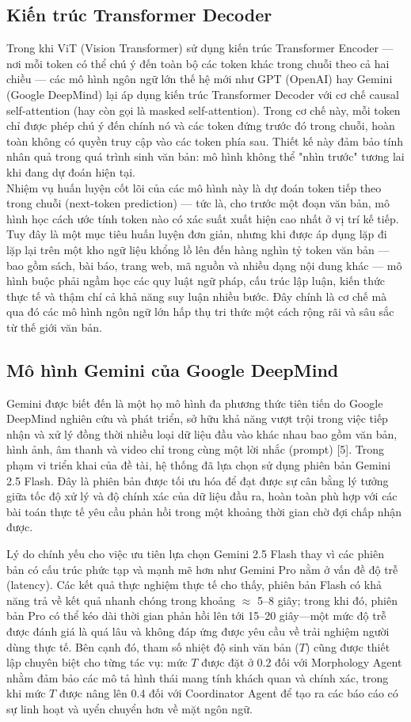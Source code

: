 \subsection{Kiến trúc Transformer Decoder}
Trong khi ViT (Vision Transformer) sử dụng kiến trúc Transformer Encoder — nơi mỗi token có thể chú ý đến toàn bộ các token khác trong chuỗi theo cả hai chiều — các mô hình ngôn ngữ lớn thế hệ mới như GPT (OpenAI) hay Gemini (Google DeepMind) lại áp dụng kiến trúc Transformer Decoder với cơ chế causal self-attention (hay còn gọi là masked self-attention). Trong cơ chế này, mỗi token chỉ được phép chú ý đến chính nó và các token đứng trước đó trong chuỗi, hoàn toàn không có quyền truy cập vào các token phía sau. Thiết kế này đảm bảo tính nhân quả trong quá trình sinh văn bản: mô hình không thể "nhìn trước" tương lai khi đang dự đoán hiện tại.\\
\indent Nhiệm vụ huấn luyện cốt lõi của các mô hình này là dự đoán token tiếp theo trong chuỗi (next-token prediction) — tức là, cho trước một đoạn văn bản, mô hình học cách ước tính token nào có xác suất xuất hiện cao nhất ở vị trí kế tiếp. Tuy đây là một mục tiêu huấn luyện đơn giản, nhưng khi được áp dụng lặp đi lặp lại trên một kho ngữ liệu khổng lồ lên đến hàng nghìn tỷ token văn bản — bao gồm sách, bài báo, trang web, mã nguồn và nhiều dạng nội dung khác — mô hình buộc phải ngầm học các quy luật ngữ pháp, cấu trúc lập luận, kiến thức thực tế và thậm chí cả khả năng suy luận nhiều bước. Đây chính là cơ chế mà qua đó các mô hình ngôn ngữ lớn hấp thụ tri thức một cách rộng rãi và sâu sắc từ thế giới văn bản.

\subsection{Mô hình Gemini của Google DeepMind}
Gemini được biết đến là một họ mô hình đa phương thức tiên tiến do Google DeepMind nghiên cứu và phát triển, sở hữu khả năng vượt trội trong việc tiếp nhận và xử lý đồng thời nhiều loại dữ liệu đầu vào khác nhau bao gồm văn bản, hình ảnh, âm thanh và video chỉ trong cùng một lời nhắc (prompt) [5]. Trong phạm vi triển khai của đề tài, hệ thống đã lựa chọn sử dụng phiên bản Gemini 2.5 Flash. Đây là phiên bản được tối ưu hóa để đạt được sự cân bằng lý tưởng giữa tốc độ xử lý và độ chính xác của dữ liệu đầu ra, hoàn toàn phù hợp với các bài toán thực tế yêu cầu phản hồi trong một khoảng thời gian chờ đợi chấp nhận được.

Lý do chính yếu cho việc ưu tiên lựa chọn Gemini 2.5 Flash thay vì các phiên bản có cấu trúc phức tạp và mạnh mẽ hơn như Gemini Pro nằm ở vấn đề độ trễ (latency). Các kết quả thực nghiệm thực tế cho thấy, phiên bản Flash có khả năng trả về kết quả nhanh chóng trong khoảng $\approx$ 5–8 giây; trong khi đó, phiên bản Pro có thể kéo dài thời gian phản hồi lên tới 15–20 giây—một mức độ trễ được đánh giá là quá lâu và không đáp ứng được yêu cầu về trải nghiệm người dùng thực tế. Bên cạnh đó, tham số nhiệt độ sinh văn bản ($T$) cũng được thiết lập chuyên biệt cho từng tác vụ: mức $T$ được đặt ở 0.2 đối với Morphology Agent nhằm đảm bảo các mô tả hình thái mang tính khách quan và chính xác, trong khi mức $T$ được nâng lên 0.4 đối với Coordinator Agent để tạo ra các báo cáo có sự linh hoạt và uyển chuyển hơn về mặt ngôn ngữ.

